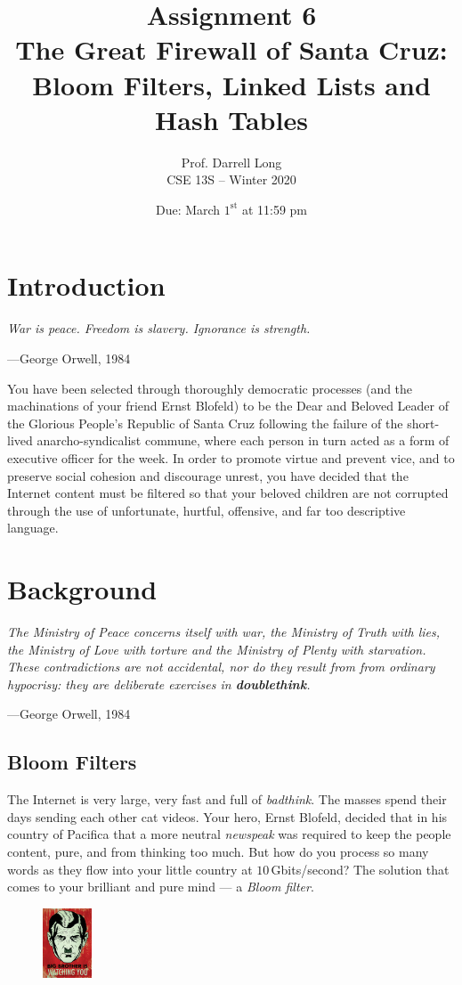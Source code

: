 \documentclass{article}
\title{Assignment 6\\The Great Firewall of Santa Cruz:\\Bloom Filters,
Linked Lists and Hash Tables}
\author{Prof. Darrell Long \\
CSE 13S -- Winter 2020}
\date{Due: March $1^\text{st}$ at 11:59 pm}
\begin{document}
\maketitle

\section{Introduction}
\textwidth \epigraph{\emph{War is peace. Freedom
is slavery. Ignorance is strength.}}{ ---George Orwell, 1984}

\noindent
You have been selected through thoroughly democratic processes (and the
machinations of your friend Ernst Blofeld) to be the Dear and Beloved Leader
of the Glorious People's Republic of Santa Cruz following the failure of the
short-lived anarcho-syndicalist commune, where each person in turn acted as
a form of executive officer for the week. In order to promote virtue and
prevent vice, and to preserve social cohesion and discourage unrest, you have
decided that the Internet content must be filtered so that your beloved
children are not corrupted through the use of unfortunate, hurtful, offensive,
and far too descriptive language.

\section{Background}
\textwidth
\epigraph{\emph{The Ministry of Peace concerns itself with war, the Ministry
of Truth with lies, the Ministry of Love with torture and the Ministry of
Plenty with starvation. These contradictions are not accidental, nor do they
result from from ordinary hypocrisy: they are deliberate exercises in
\textbf{doublethink}.}}{---George Orwell, 1984}
\subsection{Bloom Filters}
\noindent
The Internet is very large, very fast and full of \emph{badthink}. The masses
spend their days sending each other cat videos. Your hero, Ernst Blofeld,
decided that in his country of Pacifica that a more neutral \emph{newspeak}
was required to keep the people content, pure, and from thinking
too much. But how do you process so many words as they flow into
your little country at $10\,$Gbits/second? The solution that comes to
your brilliant and pure mind --- a \emph{Bloom filter}.
\begin{figure}
\centering
\includegraphics[width=0.130\textwidth]{1984-Big-Brother.jpg}
\end{figure}
\end{document}
